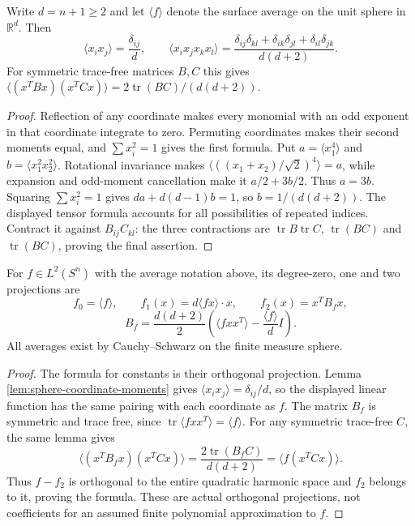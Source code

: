\begin{lemma}\label{lem:sphere-coordinate-moments}
Write $d=n+1\geq2$ and let $\langle f\rangle$ denote the surface average on the unit sphere in $\mathbb R^d$. Then
\[
 \langle x_i x_j\rangle=\frac{\delta_{ij}}d,\qquad
 \langle x_i x_j x_k x_l\rangle
 =\frac{\delta_{ij}\delta_{kl}+\delta_{ik}\delta_{jl}+\delta_{il}\delta_{jk}}{d(d+2)}.
\]
For symmetric trace-free matrices $B,C$ this gives
$\langle(x^TBx)(x^TCx)\rangle=2\operatorname{tr}(BC)/(d(d+2))$.
\end{lemma}
\begin{proof}
Reflection of any coordinate makes every monomial with an odd exponent in that coordinate integrate to zero. Permuting coordinates makes their second moments equal, and $\sum x_i^2=1$ gives the first formula. Put $a=\langle x_1^4\rangle$ and $b=\langle x_1^2x_2^2\rangle$. Rotational invariance makes $\langle((x_1+x_2)/\sqrt2)^4\rangle=a$, while expansion and odd-moment cancellation make it $a/2+3b/2$. Thus $a=3b$. Squaring $\sum x_i^2=1$ gives $da+d(d-1)b=1$, so $b=1/(d(d+2))$. The displayed tensor formula accounts for all possibilities of repeated indices. Contract it against $B_{ij}C_{kl}$: the three contractions are $\operatorname{tr}B\operatorname{tr}C$, $\operatorname{tr}(BC)$ and $\operatorname{tr}(BC)$, proving the final assertion.
\end{proof}

\begin{proposition}\label{prop:sphere-low-mode-projections}
For $f\in L^2(S^n)$ with the average notation above, its degree-zero, one and two projections are
\[
 f_0=\langle f\rangle,\qquad
 f_1(x)=d\langle f x\rangle\cdot x,\qquad
 f_2(x)=x^TB_f x,
\]
\[
 B_f=\frac{d(d+2)}2
       \left(\langle fxx^T\rangle-\frac{\langle f\rangle}{d}I\right).
\]
All averages exist by Cauchy--Schwarz on the finite measure sphere.
\end{proposition}
\begin{proof}
The formula for constants is their orthogonal projection. Lemma \ref{lem:sphere-coordinate-moments} gives $\langle x_i x_j\rangle=\delta_{ij}/d$, so the displayed linear function has the same pairing with each coordinate as $f$. The matrix $B_f$ is symmetric and trace free, since $\operatorname{tr}\langle fxx^T\rangle=\langle f\rangle$. For any symmetric trace-free $C$, the same lemma gives
\[
 \langle (x^TB_fx)(x^TCx)\rangle
 =\frac{2\operatorname{tr}(B_fC)}{d(d+2)}
 =\langle f(x^TCx)\rangle.
\]
Thus $f-f_2$ is orthogonal to the entire quadratic harmonic space and $f_2$ belongs to it, proving the formula. These are actual orthogonal projections, not coefficients for an assumed finite polynomial approximation to $f$.
\end{proof}

